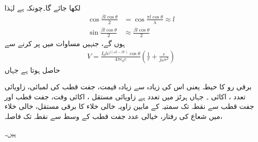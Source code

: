 لکھا جائے گا۔چونکہ  ہے لہٰذا 
\begin{align*}
\cos \frac{\beta l \cos \theta}{2}&=\cos \frac{\pi l \cos \theta}{\lambda}\approx l\\
\sin \frac{\beta l \cos \theta}{2}&\approx \frac{\beta l \cos \theta}{2}
\end{align*}
ہوں گے، جنہیں مساوات  میں پر کرنے سے
\begin{align}\label{مساوات_اینٹینا_مقداری_دباو_ت}
V=\frac{I_0 l e^{j(\omega t -\beta r)} \cos \theta}{4\pi \epsilon_0 c}\left(\frac{1}{r}+\frac{c}{j\omega r^2} \right)
\end{align}
حاصل ہوتا ہے جہاں
\begin{description}
 برقی رو کا حیطہ یعنی اس کی زیادہ سے زیادہ قیمت، 
 جفت قطب کی لمبائی، 
  زاویائی تعدد  ، اکائی ۔ جہاں ہرٹز میں تعدد  ہے
 زاویائی مستقل ، اکائی 
وقت، 
جفت قطب اور جفت قطب سے نقطہ  تک سمتیہ کے مابین زاویہ
خالی خلاء کا برقی مستقل، 
خالی خلاء میں شعاع کی رفتار، 
خیالی عدد 
جفت قطب کے وسط سے نقطہ  تک فاصلہ،
\end{description}
ہیں۔

